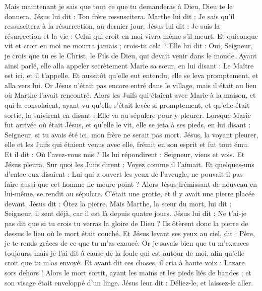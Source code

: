 \begin{multicols}{2}
Mais maintenant je sais que tout ce que tu demanderas à Dieu, Dieu te le donnera.
Jésus lui dit : Ton frère ressuscitera.
Marthe lui dit : Je sais qu'il ressuscitera à la résurrection, au dernier jour.
Jésus lui dit : Je suis la résurrection et la vie : Celui qui croit en moi vivra même s'il meurt.
Et quiconque vit et croit en moi ne mourra jamais ; crois-tu cela ?
Elle lui dit : Oui, Seigneur, je crois que tu es le Christ, le Fils de Dieu, qui devait venir dans le monde.
Ayant ainsi parlé, elle alla appeler secrètement Marie sa sœur, en lui disant : Le Maître est ici, et il t'appelle.
Et aussitôt qu'elle eut entendu, elle se leva promptement, et alla vers lui.
Or Jésus n'était pas encore entré dans le village, mais il était au lieu où Marthe l'avait rencontré.
Alors les Juifs qui étaient avec Marie à la maison, et qui la consolaient, ayant vu qu'elle s'était levée si promptement, et qu'elle était sortie, la suivirent en disant : Elle va au sépulcre pour y pleurer.
Lorsque Marie fut arrivée où était Jésus, et qu'elle le vit, elle se jeta à ses pieds, en lui disant : Seigneur, si tu avais été ici, mon frère ne serait pas mort.
Jésus, la voyant pleurer, elle et les Juifs qui étaient venus avec elle, frémit en son esprit et fut tout ému.
Et il dit : Où l'avez-vous mis ? Ils lui répondirent : Seigneur, viens et vois.
Et Jésus pleura.
Sur quoi les Juifs dirent : Voyez comme il l'aimait.
Et quelques-uns d'entre eux disaient : Lui qui a ouvert les yeux de l'aveugle, ne pouvait-il pas faire aussi que cet homme ne meure point ?
Alors Jésus frémissant de nouveau en lui-même, se rendit au sépulcre. C'était une grotte, et il y avait une pierre placée devant.
Jésus dit : Ôtez la pierre. Mais Marthe, la sœur du mort, lui dit : Seigneur, il sent déjà, car il est là depuis quatre jours.
Jésus lui dit : Ne t'ai-je pas dit que si tu crois tu verras la gloire de Dieu ?
Ils ôtèrent donc la pierre de dessus le lieu où le mort était couché. Et Jésus levant ses yeux au ciel, dit : Père, je te rends grâces de ce que tu m'as exaucé.
Or je savais bien que tu m'exauces toujours; mais je l'ai dit à cause de la foule qui est autour de moi, afin qu'elle croit que tu m'as envoyé.
Et ayant dit ces choses, il cria à haute voix : Lazare sors dehors !
Alors le mort sortit, ayant les mains et les pieds liés de bandes ; et son visage était enveloppé d'un linge. Jésus leur dit : Déliez-le, et laissez-le aller.

\end{multicols}

